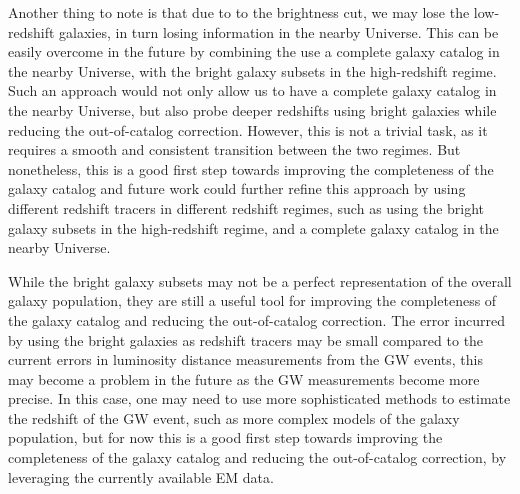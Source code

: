 Another thing to note is that due to to the brightness cut, we may lose the low-redshift galaxies, in turn losing information in the nearby Universe. This can be easily overcome in the future by combining the use a complete galaxy catalog in the nearby Universe, with the bright galaxy subsets in the high-redshift regime. Such an approach would not only allow us to have a complete galaxy catalog in the nearby Universe, but also probe deeper redshifts using bright galaxies while reducing the out-of-catalog correction. However, this is not a trivial task, as it requires a smooth and consistent transition between the two regimes. But nonetheless, this is a good first step towards improving the completeness of the galaxy catalog and future work could further refine this approach by using different redshift tracers in different redshift regimes, such as using the bright galaxy subsets in the high-redshift regime, and a complete galaxy catalog in the nearby Universe.

While the bright galaxy subsets may not be a perfect representation of the overall galaxy population, they are still a useful tool for improving the completeness of the galaxy catalog and reducing the out-of-catalog correction. The error incurred by using the bright galaxies as redshift tracers may be small compared to the current errors in luminosity distance measurements from the \ac{GW} events, this may become a problem in the future as the \ac{GW} measurements become more precise. In this case, one may need to use more sophisticated methods to estimate the redshift of the \ac{GW} event, such as more complex models of the galaxy population, but for now this is a good first step towards improving the completeness of the galaxy catalog and reducing the out-of-catalog correction, by leveraging the currently available \ac{EM} data.


